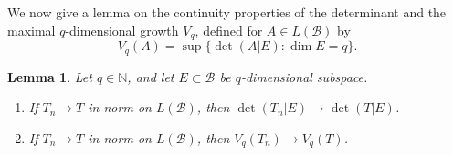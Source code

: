 \documentclass[11pt]{amsart}
\theoremstyle{theorem}
\newtheorem{lem}[thm]{Lemma}
\theoremstyle{definition}
\newtheorem{rmk}[thm]{Remark}
\numberwithin{equation}{section}
\newcommand{\N}{\mathbb{N}}
\newcommand{\R}{\mathbb{R}}
\newcommand{\Bc}{\mathcal{B}}
\begin{document}
We now give a lemma on the continuity properties of the determinant and the maximal $q$-dimensional growth $V_q$, defined for $A \in L(\Bc)$ by
\[
V_q(A) = \sup\{\det(A | E) : \dim E = q\}.
\]

\begin{lem}\label{lem:measDet}
Let $q \in \N$, and let $E \subset \Bc$ be $q$-dimensional subspace.

\begin{enumerate}
\item If $T_n \to T$ in norm on $L(\Bc)$, then $\det(T_n | E) \to \det(T | E)$.

\item If $T_n \to T$ in norm on $L(\Bc)$, then $ V_q(T_n) \to V_q(T)$.

\end{enumerate}
\end{lem}

\end{document}
